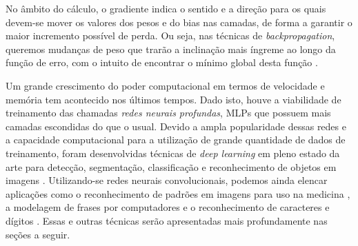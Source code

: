 No âmbito do cálculo, o gradiente indica o sentido e a direção para os quais devem-se mover os valores dos pesos e do bias nas camadas, de forma a garantir o maior incremento possível de perda. Ou seja, nas técnicas de \emph{backpropagation}, queremos mudanças de peso que trarão a inclinação mais íngreme ao longo da função de erro, com o intuito de encontrar o mínimo global desta função \cite{goodfellow, kubat}.

Um grande crescimento do poder computacional em termos de velocidade e memória tem acontecido nos últimos tempos. Dado isto, houve a viabilidade de treinamento das chamadas \emph{redes neurais profundas}, MLPs que possuem mais camadas escondidas do que o usual. Devido a ampla popularidade dessas redes e a capacidade computacional para a utilização de grande quantidade de dados de treinamento, foram desenvolvidas técnicas de \emph{deep learning} em pleno estado da arte para detecção, segmentação, classificação e reconhecimento de objetos em imagens \cite{khan}. Utilizando-se redes neurais convolucionais, podemos ainda elencar aplicações como o reconhecimento de padrões em imagens para uso na medicina \cite{cha}, a modelagem de frases por computadores \cite{kalchbrenner} e o reconhecimento de caracteres e dígitos \cite{lecun}. Essas e outras técnicas serão apresentadas mais profundamente nas seções a seguir.

